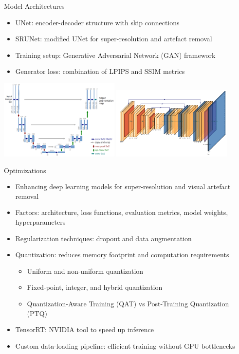 \documentclass{beamer}
\begin{document}
\begin{frame}{Model Architectures}
\begin{itemize}
  \item UNet: encoder-decoder structure with skip connections
  \item SRUNet: modified UNet for super-resolution and artefact removal
  \item Training setup: Generative Adversarial Network (GAN) framework
  \item Generator loss: combination of LPIPS and SSIM metrics
\end{itemize}
\includegraphics[width=0.45\textwidth]{../thesis/static/unet_architecture.png}
\includegraphics[width=0.45\textwidth]{../thesis/static/srunet_architecture.png}
\end{frame}
\begin{frame}{Optimizations}
\begin{itemize}
  \item Enhancing deep learning models for super-resolution and visual artefact removal
  \item Factors: architecture, loss functions, evaluation metrics, model weights, hyperparameters
  \item Regularization techniques: dropout and data augmentation
  \item Quantization: reduces memory footprint and computation requirements
  \begin{itemize}
    \item Uniform and non-uniform quantization
    \item Fixed-point, integer, and hybrid quantization
    \item Quantization-Aware Training (QAT) vs Post-Training Quantization (PTQ)
  \end{itemize}
  \item TensorRT: NVIDIA tool to speed up inference
  \item Custom data-loading pipeline: efficient training without GPU bottlenecks
\end{itemize}
\end{frame}
\end{document}
